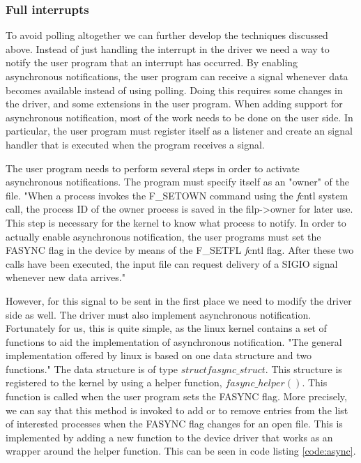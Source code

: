 \subsubsection{Full interrupts}
To avoid polling altogether we can further develop the techniques discussed above. Instead of just handling the interrupt in the driver we need a way to notify the user program that an interrupt has occurred. By enabling asynchronous notifications, the user program can receive a signal whenever data becomes available instead of using polling. Doing this requires some changes in the driver, and some extensions in the user program. When adding support for asynchronous notification, most of the work needs to be done on the user side. In particular, the user program must register itself as a listener and create an signal handler that is executed when the program receives a signal. 

The user program needs to perform several steps in order to activate asynchronous notifications. The program must specify itself as an "owner" of the file. "When a process invokes the F\_SETOWN command using the {\emph fcntl} system call, the process ID of the owner process is saved in the filp->owner for later use. This step is necessary for the kernel to know what process to notify. In order to actually enable asynchronous notification, the user programs must set the FASYNC flag in the device by means of the F\_SETFL {\emph fcntl} flag. After these two calls have been executed, the input file can request delivery of a SIGIO signal whenever new data arrives."

However, for this signal to be sent in the first place we need to modify the driver side as well. The driver must also implement asynchronous notification. Fortunately for us, this is quite simple, as the linux kernel contains a set of functions to aid the implementation of asynchronous notification. "The general implementation offered by linux is based on one data structure and two functions." The data structure is of type $struct fasync\_struct$. This structure  is registered to the kernel by using a helper function, $fasync\_helper()$. This function is called when the user program sets the FASYNC flag. More precisely, we can say that this method is invoked to add or to remove entries from the list of interested processes when the FASYNC flag changes for an open file. This is implemented by adding a new function to the device driver that works as an wrapper around the helper function. This can be seen in code listing \ref{code:async}.

